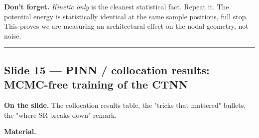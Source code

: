 \documentclass[11pt]{article}
\begin{document}
\textbf{Don't forget.} \emph{Kinetic only} is the cleanest statistical fact. Repeat
it. The potential energy is statistically identical at the same sample
positions, full stop. This proves we are measuring an architectural
effect on the nodal geometry, not noise.

\vspace{4pt}\hrule\vspace{8pt}

\subsection*{Slide 15 --- PINN / collocation results: MCMC-free training of the CTNN}

\textbf{On the slide.} The collocation results table, the "tricks that
mattered" bullets, the "where SR breaks down" remark.

\textbf{Material.}
\end{document}

